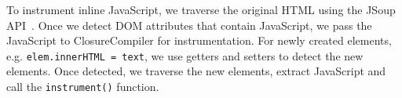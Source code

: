 To instrument inline JavaScript, we traverse the original HTML using the JSoup API~\cite{jsoup}.  Once we detect DOM attributes that contain JavaScript, we pass the JavaScript to ClosureCompiler for instrumentation.  
For newly created elements, e.g. {\tt elem.innerHTML = text}, we use getters and setters to detect the new elements.  Once detected, we traverse the new elements, extract JavaScript and call the {\tt instrument()} function.  

